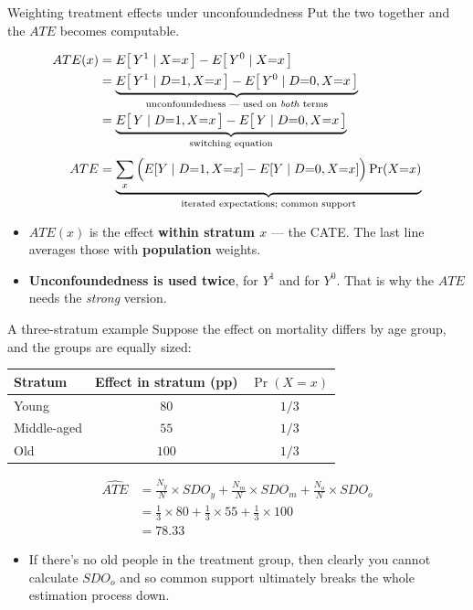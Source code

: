 \documentclass[
  11pt,
  ignorenonframetext,
  aspectratio=169,
]{beamer}
\providecommand{\tightlist}{%
  \setlength{\itemsep}{0pt}\setlength{\parskip}{0pt}}
\begin{document}
\begin{frame}{Weighting treatment effects under unconfoundedness}
\protect{}\label{weighting-treatment-effects-under-unconfoundedness}
Put the two together and the \(ATE\) becomes computable.

\[
\begin{aligned}
ATE(x) &= E\big[\,Y^1 \mid X{=}x\,\big] - E\big[\,Y^0 \mid X{=}x\,\big] \\
       &= \underbrace{E\big[\,Y^1 \mid D{=}1, X{=}x\,\big] - E\big[\,Y^0 \mid D{=}0, X{=}x\,\big]}_{\text{unconfoundedness --- used on \emph{both} terms}} \\
       &= \underbrace{E\big[\,Y \mid D{=}1, X{=}x\,\big] - E\big[\,Y \mid D{=}0, X{=}x\,\big]}_{\text{switching equation}} \\[0.3em]
ATE    &= \underbrace{\sum_x \Big( E[Y \mid D{=}1, X{=}x] - E[Y \mid D{=}0, X{=}x] \Big)\Pr(X{=}x)}_{\text{iterated expectations; common support}}
\end{aligned}
\]

\begin{itemize}
\tightlist
\item
  \(ATE(x)\) is the effect \textbf{within stratum \(x\)} --- the CATE.
  The last line averages those with \textbf{population} weights.
\item
  \textbf{Unconfoundedness is used twice}, for \(Y^1\) and for \(Y^0\).
  That is why the \(ATE\) needs the \emph{strong} version.
\end{itemize}
\end{frame}

\begin{frame}{A three-stratum example}
\protect{}\label{a-three-stratum-example}
Suppose the effect on mortality differs by age group, and the groups are
equally sized:

\begin{center}
\begin{tabular}{lcc}
\toprule
Stratum & Effect in stratum (pp) & $\Pr(X = x)$ \\
\midrule
Young       & $80$  & $1/3$ \\
Middle-aged & $55$  & $1/3$ \\
Old         & $100$ & $1/3$ \\
\bottomrule
\end{tabular}
\end{center}

\[
\begin{aligned}
  \widehat{\mathit{ATE}} &= \frac{N_y}{N} \times SDO_{y} +
  \frac{N_m}{N} \times SDO_{m} + \frac{N_o}{N} \times SDO_{o} \\
  &= \frac{1}{3} \times 80 + \frac{1}{3} \times 55 + \frac{1}{3} \times 100 \\
  &= 78.33
\end{aligned}
\]

\begin{itemize}
\tightlist
\item
  If there's no old people in the treatment group, then clearly you
  cannot calculate \(SDO_{o}\) and so common support ultimately breaks
  the whole estimation process down.
\end{itemize}
\end{frame}
\end{document}
